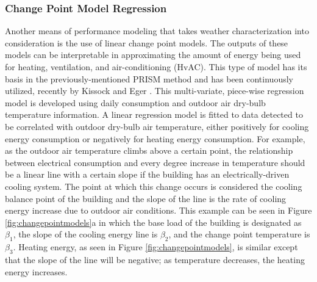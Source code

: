 \subsubsection{Change Point Model Regression}
\label{sec:changepointmodels}

Another means of performance modeling that takes weather characterization into consideration is the use of linear change point models. The outputs of these models can be interpretable in approximating the amount of energy being used for heating, ventilation, and air-conditioning (HvAC). This type of model has its basis in the previously-mentioned PRISM method and has been continuously utilized, recently by Kissock and Eger \cite{Kelly_Kissock_2008}. This multi-variate, piece-wise regression model is developed using daily consumption and outdoor air dry-bulb temperature information. A linear regression model is fitted to data detected to be correlated with outdoor dry-bulb air temperature, either positively for cooling energy consumption or negatively for heating energy consumption. For example, as the outdoor air temperature climbs above a certain point, the relationship between electrical consumption and every degree increase in temperature should be a linear line with a certain slope if the building has an electrically-driven cooling system. The point at which this change occurs is considered the cooling balance point of the building and the slope of the line is the rate of cooling energy increase due to outdoor air conditions. This example can be seen in Figure \ref{fig:changepointmodels}a in which the base load of the building is designated as $\beta_1$, the slope of the cooling energy line is $\beta_2$, and the change point temperature is $\beta_3$. Heating energy, as seen in Figure \ref{fig:changepointmodels}, is similar except that the slope of the line will be negative; as temperature decreases, the heating energy increases.